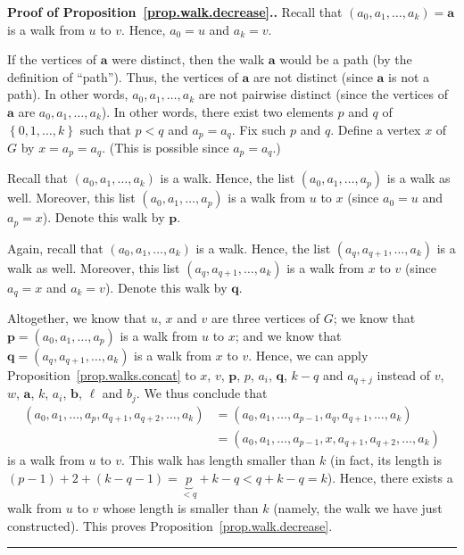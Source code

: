 \documentclass[numbers=enddot,12pt,final,onecolumn,notitlepage]{scrartcl}%
\theoremstyle{definition}
\newenvironment{proof}[1][Proof]{\noindent\textbf{#1.} }{\ \rule{0.5em}{0.5em}}
\newcommand{\set}[1]{\left\{ #1 \right\}}
\newcommand{\tup}[1]{\left( #1 \right)}
\begin{document}
\begin{proof}[Proof of Proposition~\ref{prop.walk.decrease}.]
Recall that $\tup{a_0, a_1, \ldots, a_k} = \mathbf{a}$ is a walk
from $u$ to $v$. Hence, $a_0 = u$ and $a_k = v$.

If the vertices of $\mathbf{a}$ were distinct, then the walk
$\mathbf{a}$ would be a path (by the definition of ``path''). Thus,
the vertices of $\mathbf{a}$ are not distinct (since $\mathbf{a}$ is
not a path). In other words, $a_0, a_1, \ldots, a_k$ are not
pairwise distinct (since the vertices of $\mathbf{a}$ are
$a_0, a_1, \ldots, a_k$). In other words, there exist two elements
$p$ and $q$ of $\set{0, 1, \ldots, k}$ such that $p < q$ and
$a_p = a_q$. Fix such $p$ and $q$. Define a vertex $x$ of $G$ by
$x = a_p = a_q$. (This is possible since $a_p = a_q$.)

Recall that $\tup{a_0, a_1, \ldots, a_k}$ is a walk. Hence, the list
$\tup{a_0, a_1, \ldots, a_p}$ is a walk as well. Moreover, this list
$\tup{a_0, a_1, \ldots, a_p}$ is a walk from $u$ to $x$ (since
$a_0 = u$ and $a_p = x$). Denote this walk by $\mathbf{p}$.

Again, recall that $\tup{a_0, a_1, \ldots, a_k}$ is a walk. Hence, the
list $\tup{a_q, a_{q+1}, \ldots, a_k}$ is a walk as well. Moreover,
this list $\tup{a_q, a_{q+1}, \ldots, a_k}$ is a walk from $x$ to $v$
(since $a_q = x$ and $a_k = v$). Denote this walk by $\mathbf{q}$.

Altogether, we know that $u$, $x$ and $v$ are three vertices of $G$;
we know that $\mathbf{p} = \tup{a_0, a_1, \ldots, a_p}$ is a walk from
$u$ to $x$; and we know that
$\mathbf{q} = \tup{a_q, a_{q+1}, \ldots, a_k}$ is a walk from $x$ to
$v$.
Hence, we can apply Proposition~\ref{prop.walks.concat} to
$x$, $v$, $\mathbf{p}$, $p$, $a_i$, $\mathbf{q}$, $k-q$ and $a_{q+j}$
instead of $v$, $w$, $\mathbf{a}$, $k$, $a_i$, $\mathbf{b}$, $\ell$
and $b_j$. We thus conclude that
\begin{align*}
\tup{a_0, a_1, \ldots, a_p, a_{q+1}, a_{q+2}, \ldots, a_k}
&= \tup{a_0, a_1, \ldots, a_{p-1}, a_q, a_{q+1}, \ldots, a_k} \\
&= \tup{a_0, a_1, \ldots, a_{p-1}, x, a_{q+1}, a_{q+2}, \ldots, a_k}
\end{align*}
is a walk from $u$ to $v$. This walk has length smaller than $k$
(in fact, its length is
$\tup{p-1} + 2 + \tup{k-q-1} = \underbrace{p}_{< q} + k - q
< q + k - q = k$). Hence, there exists a walk from $u$ to $v$ whose
length is smaller than $k$ (namely, the walk we have just
constructed).
This proves Proposition~\ref{prop.walk.decrease}.
\end{proof}
\end{document}
